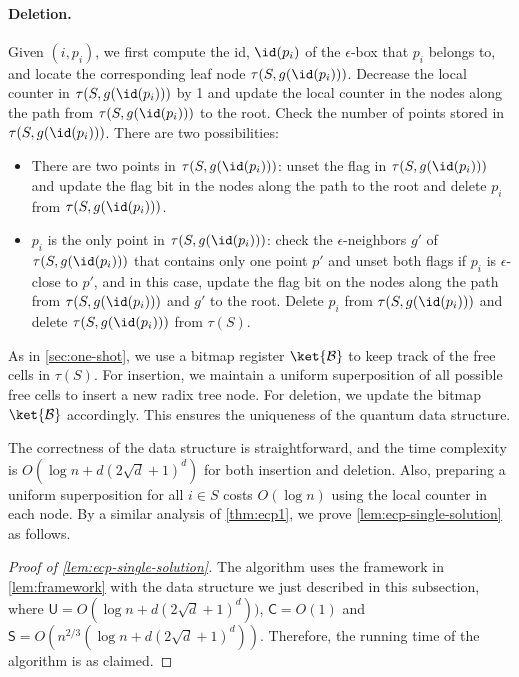 \paragraph{Deletion.} Given $(i, p_i)$, we first compute the id, $\id(p_i)$ of the $\epsilon$-box that $p_i$ belongs to, and locate the corresponding leaf node $\tau(S, g(\id(p_i)))$. Decrease the local counter in $\tau(S, g(\id(p_i)))$ by 1 and update the local counter in the nodes along the path from $\tau(S, g(\id(p_i)))$ to the root. Check the number of points stored in $\tau(S, g(\id(p_i)))$. There are two possibilities:
\begin{itemize}
  \item There are two points in $\tau(S, g(\id(p_i)))$: unset the flag in $\tau(S, g(\id(p_i)))$ and update the flag bit in the nodes along the path to the root and delete $p_i$ from $\tau(S, g(\id(p_i)))$.
  \item $p_i$ is the only point in $\tau(S, g(\id(p_i)))$: check the $\epsilon$-neighbors $g'$ of $\tau(S, g(\id(p_i)))$ that contains only one point $p'$ and unset both flags if $p_i$ is $\epsilon$-close to $p'$, and in this case, update the flag bit on the nodes along the path from $\tau(S, g(\id(p_i)))$ and $g'$ to the root. Delete $p_i$ from $\tau(S, g(\id(p_i)))$ and delete $\tau(S, g(\id(p_i)))$ from $\tau(S)$.
\end{itemize}

As in \cref{sec:one-shot}, we use a bitmap register $\ket{\mathcal{B}}$ to keep track of the free cells in $\tau(S)$. For insertion, we maintain a uniform superposition of all possible free cells to insert a new radix tree node. For deletion, we update the bitmap $\ket{\mathcal{B}}$ accordingly. This ensures the uniqueness of the quantum data structure.

The correctness of the data structure is straightforward, and the time complexity is $O(\log n + d(2\sqrt{d}+1)^d)$ for both insertion and deletion. Also, preparing a uniform superposition for all $i \in S$ costs $O(\log n)$ using the local counter in each node. By a similar analysis of \cref{thm:ecp1}, we prove \cref{lem:ecp-single-solution} as follows.

\begin{proof}[Proof of \cref{lem:ecp-single-solution}]
The algorithm uses the framework in \cref{lem:framework} with the data structure we just described in this subsection, where $\mathsf{U} = O(\log n + d(2\sqrt{d}+1)^d))$,  $\mathsf{C} = O(1)$ and $\mathsf{S} = O(n^{2/3}(\log n + d(2\sqrt{d}+1)^d))$. 
%
Therefore, the running time of the algorithm is as claimed.
\end{proof}

